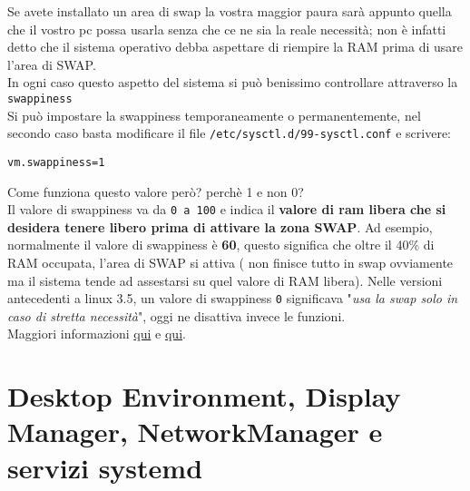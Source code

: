 \documentclass[twoside,italian]{book}
\newcommand{\centcode}[1]{
	
	\definecolor{centcode}{rgb}{0.5,0.1,0.1}
	
	\begin{center}
	 	\texttt{\textcolor{centcode}{#1}}
	\end{center}
	
	
}
\newcommand{\code}[1]{
	\texttt{\textcolor{code}{#1}}
}
\begin{document}
			Se avete installato un area di swap la vostra maggior paura sarà appunto quella che il vostro pc possa usarla senza che ce ne sia la reale necessità; non è infatti detto che il sistema operativo debba aspettare di riempire la RAM prima di usare l'area di SWAP.\\
			In ogni caso questo aspetto del sistema si può benissimo controllare attraverso la \code{swappiness}\\
			Si può impostare la swappiness temporaneamente o permanentemente, nel secondo caso basta modificare il file \code{/etc/sysctl.d/99-sysctl.conf} e scrivere:
			
			\centcode{vm.swappiness=1}
			
			Come funziona questo valore però? perchè 1 e non 0?\\
			Il valore di swappiness va da \code{0 a 100} e indica il \textbf{valore di ram libera che si desidera tenere libero prima di attivare la zona SWAP}.
			Ad esempio, normalmente il valore di swappiness è \textbf{60}, questo significa che oltre il 40\% di RAM occupata, l'area di SWAP si attiva ( non finisce tutto in swap ovviamente ma il sistema tende ad assestarsi su quel valore di RAM libera).
			Nelle versioni antecedenti a linux 3.5, un valore di swappiness \code{0} significava "\textit{usa la swap solo in caso di stretta necessità}", oggi ne disattiva invece le funzioni.\\
			Maggiori informazioni \href{https://www.kernel.org/doc/Documentation/sysctl/vm.txt}{qui} e \href{https://en.wikipedia.org/wiki/Swappiness}{qui}.
			
			
					
	\chapter{Desktop Environment, Display Manager, NetworkManager e servizi systemd}
\end{document}
